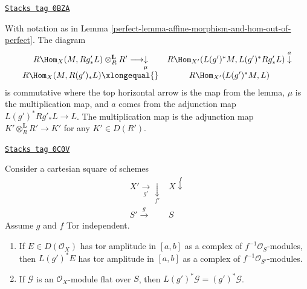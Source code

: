\begin{remark}
\label{perfect-remark-multiplication-map}
\href{https://stacks.math.columbia.edu/tag/0BZA}{\texttt{Stacks tag 0BZA}}

With notation as in Lemma \ref{perfect-lemma-affine-morphism-and-hom-out-of-perfect}.
The diagram
$$
\begin{array}{cc}R\Hom_X(M, Rg'_*L) \otimes_R^\mathbf{L} R' \longrightarrow\underset{\mu}{\downarrow} & R\Hom_{X'}(L(g')^*M, L(g')^*Rg'_*L) \overset{a}{\downarrow} \\ R\Hom_X(M, R(g')_*L) \xlongequal{} & R\Hom_{X'}(L(g')^*M, L)\end{array}
$$
is commutative where the top horizontal arrow is the map from the lemma,
$\mu$ is the multiplication map, and $a$ comes from the adjunction map
$L(g')^*Rg'_*L \to L$. The multiplication map is the adjunction map
$K' \otimes_R^\mathbf{L} R' \to K'$ for any $K' \in D(R')$.
\end{remark}

\begin{lemma}
\label{perfect-lemma-tor-independence-and-tor-amplitude}
\href{https://stacks.math.columbia.edu/tag/0C0V}{\texttt{Stacks tag 0C0V}}

Consider a cartesian square of schemes
$$
\begin{array}{cc}X' \underset{g'}{\longrightarrow}\underset{f'}{\downarrow} & X \overset{f}{\downarrow} \\ S' \overset{g}{\longrightarrow} & S\end{array}
$$
Assume $g$ and $f$ Tor independent.
\begin{enumerate}
\item If $E \in D(\mathcal{O}_X)$ has tor amplitude
in $[a, b]$ as a complex of $f^{-1}\mathcal{O}_S$-modules,
then $L(g')^*E$ has tor amplitude
in $[a, b]$ as a complex of $f^{-1}\mathcal{O}_{S'}$-modules.
\item If $\mathcal{G}$ is an $\mathcal{O}_X$-module flat
over $S$, then $L(g')^*\mathcal{G} = (g')^*\mathcal{G}$.
\end{enumerate}
\end{lemma}

